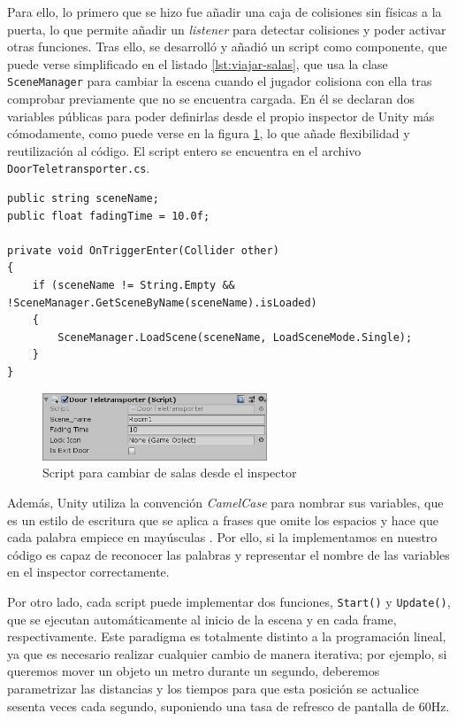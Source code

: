 Para ello, lo primero que se hizo fue añadir una caja de colisiones sin físicas a la puerta, lo que permite añadir un \textit{listener} para detectar colisiones y poder activar otras funciones. Tras ello, se desarrolló y añadió un script como componente, que puede verse simplificado en el listado \ref{lst:viajar-salas}, que usa la clase \texttt{SceneManager} para cambiar la escena cuando el jugador colisiona con ella tras comprobar previamente que no se encuentra cargada. En él se declaran dos variables públicas para poder definirlas desde el propio inspector de Unity más cómodamente, como puede verse en la figura \ref{fig:door-teleporter-inspector}, lo que añade flexibilidad y reutilización al código. El script entero se encuentra en el archivo \texttt{DoorTeletransporter.cs}.

\begin{lstlisting}[caption=Fragmento del script para viajar entre salas, label=lst:viajar-salas]
public string sceneName;
public float fadingTime = 10.0f;

private void OnTriggerEnter(Collider other)
{
    if (sceneName != String.Empty && !SceneManager.GetSceneByName(sceneName).isLoaded)
    {
        SceneManager.LoadScene(sceneName, LoadSceneMode.Single);
    }
}
\end{lstlisting}

\begin{figure}[!h]
\begin{center}
\includegraphics[width=0.6\textwidth]{imagenes/7/door-teleporter-inspector.jpg}
\caption{Script para cambiar de salas desde el inspector}
\label{fig:door-teleporter-inspector}
\end{center}
\end{figure}

Además, Unity utiliza la convención \textit{CamelCase} para nombrar sus variables, que es un estilo de escritura que se aplica a frases que omite los espacios y hace que cada palabra empiece en mayúsculas . Por ello, si la implementamos en nuestro código es capaz de reconocer las palabras y representar el nombre de las variables en el inspector correctamente.

Por otro lado, cada script puede implementar dos funciones, \texttt{Start()} y \texttt{Update()}, que se ejecutan automáticamente al inicio de la escena y en cada frame, respectivamente. Este paradigma es totalmente distinto a la programación lineal, ya que es necesario realizar cualquier cambio de manera iterativa; por ejemplo, si queremos mover un objeto un metro durante un segundo, deberemos parametrizar las distancias y los tiempos para que esta posición se actualice sesenta veces cada segundo, suponiendo una tasa de refresco de pantalla de 60Hz.

